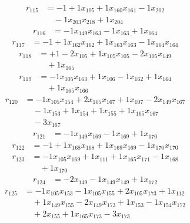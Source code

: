 \[\begin{aligned}
r_{115} &= - 1 + 1 x_{105} + 1 x_{160} x_{161} - 1 x_{202} \\
 &\quad - 1 x_{203} x_{218} + 1 x_{204}
\end{aligned}\]
\[\begin{aligned}
r_{116} &= - 1 x_{149} x_{163} - 1 x_{163} + 1 x_{164}
\end{aligned}\]
\[\begin{aligned}
r_{117} &= - 1 + 1 x_{162} x_{162} + 1 x_{163} x_{163} - 1 x_{164} x_{164}
\end{aligned}\]
\[\begin{aligned}
r_{118} &= + 1 - 2 x_{105} + 1 x_{105} x_{105} - 2 x_{105} x_{149} \\
 &\quad + 1 x_{165}
\end{aligned}\]
\[\begin{aligned}
r_{119} &= - 1 x_{105} x_{163} + 1 x_{106} - 1 x_{162} + 1 x_{164} \\
 &\quad + 1 x_{165} x_{166}
\end{aligned}\]
\[\begin{aligned}
r_{120} &= - 1 x_{105} x_{154} + 2 x_{105} x_{167} + 1 x_{107} - 2 x_{149} x_{167} \\
 &\quad - 1 x_{153} + 1 x_{154} + 1 x_{155} + 1 x_{165} x_{167} \\
 &\quad - 3 x_{167}
\end{aligned}\]
\[\begin{aligned}
r_{121} &= - 1 x_{149} x_{169} - 1 x_{169} + 1 x_{170}
\end{aligned}\]
\[\begin{aligned}
r_{122} &= - 1 + 1 x_{168} x_{168} + 1 x_{169} x_{169} - 1 x_{170} x_{170}
\end{aligned}\]
\[\begin{aligned}
r_{123} &= - 1 x_{105} x_{169} + 1 x_{111} + 1 x_{165} x_{171} - 1 x_{168} \\
 &\quad + 1 x_{170}
\end{aligned}\]
\[\begin{aligned}
r_{124} &= - 2 x_{149} - 1 x_{149} x_{149} + 1 x_{172}
\end{aligned}\]
\[\begin{aligned}
r_{125} &= - 1 x_{105} x_{153} - 1 x_{105} x_{155} + 2 x_{105} x_{173} + 1 x_{112} \\
 &\quad + 1 x_{149} x_{155} - 2 x_{149} x_{173} + 1 x_{153} - 1 x_{154} x_{172} \\
 &\quad + 2 x_{155} + 1 x_{165} x_{173} - 3 x_{173}
\end{aligned}\]

